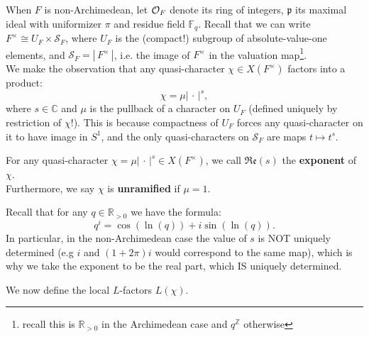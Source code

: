\documentclass[11pt, x11names, openany]{book}
\newcommand{\zz}{\mathbb{Z}}
\newcommand{\rr}{\mathbb{R}}
\newcommand{\cc}{\mathbb{C}}
\newcommand{\ff}{\mathbb{F}}
\newcommand{\pp}{\mathfrak{p}}
\newcommand{\cals}{\mathcal{S}}
\newcommand{\abs}[1]{\left| \, #1  \,\right|}
\newcommand{\re}[1]{\mathfrak{Re} \left( #1 \right)}
\begin{document}
When $F$ is non-Archimedean, let $\mathcal{O}_F$ denote its ring of integers, $\pp$ its maximal ideal with uniformizer $\pi$ and residue field $\ff_q$. Recall that we can write $F^\times \cong U_F \times \cals_F$, where $U_F$ is the (compact!) subgroup of absolute-value-one elements, and $\cals_F = \abs{F^\times}$, i.e. the image of $F^\times$ in the valuation map\footnote{recall this is $\rr_{> 0}$ in the Archimedean case and $q^\zz$ otherwise}.\\
We make the observation that any quasi-character $\chi \in X(F^\times)$ factors into a product:
\begin{equation*}
    \chi = \mu \abs{\cdot}^s,
\end{equation*}
where $s \in \cc$ and $\mu$ is the pullback of a character on $U_F$ (defined uniquely by restriction of $\chi$!). This is because compactness of $U_F$ forces any quasi-character on it to have image in $S^1$, and the only quasi-characters on $\cals_F$ are maps $t \mapsto t^s$.
\begin{defn}
\label{def: exponent and unramified character}
    For any quasi-character  $\chi = \mu \abs{\cdot}^s \in X(F^\times)$, we call $\re{s}$ the \textbf{exponent} of $\chi$.\\
    Furthermore, we say $\chi$ is \textbf{unramified} if $\mu = 1$.
\end{defn}
\begin{warning}
    Recall that for any $q \in \rr_{> 0}$ we have the formula:
    \begin{equation*}
        q^i = \cos(\ln(q)) + i \sin(\ln(q)).
    \end{equation*}
    In particular, in the non-Archimedean case the value of $s$ is NOT uniquely determined (e.g $i$ and $(1 + 2\pi)i$ would correspond to the same map), which is why we take the exponent to be the real part, which IS uniquely determined.
\end{warning}

We now define the local $L$-factors $L(\chi)$.
\end{document}

